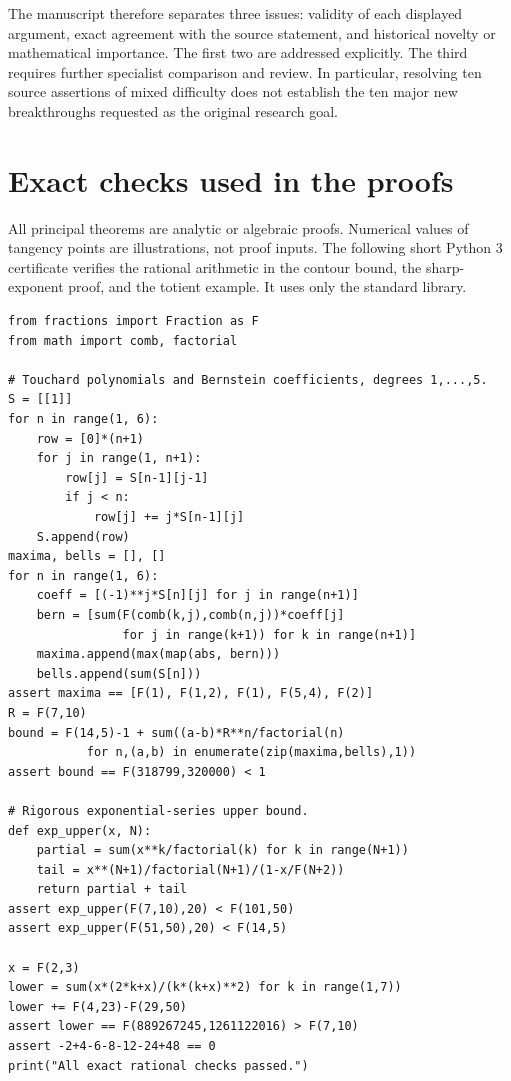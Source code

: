 \documentclass[11pt,a4paper]{article}
\theoremstyle{definition}
\theoremstyle{remark}
\numberwithin{equation}{section}
\renewcommand{\thesection}{\Roman{part}.\arabic{section}}
\renewcommand{\theHsection}{\arabic{part}.main.\arabic{section}}
\newcommand{\PartAppendix}{%
 \setcounter{section}{0}\setcounter{subsection}{0}%
 \renewcommand{\thesection}{\Roman{part}.\Alph{section}}%
 \renewcommand{\theHsection}{\arabic{part}.appendix.\arabic{section}}}
\begin{document}
The manuscript therefore separates three issues: validity of each
displayed argument, exact agreement with the source statement, and
historical novelty or mathematical importance. The first two are
addressed explicitly. The third requires further specialist comparison
and review. In particular, resolving ten source assertions of mixed
difficulty does not establish the ten major new breakthroughs requested
as the original research goal.

\PartAppendix
\section{Exact checks used in the proofs}
All principal theorems are analytic or algebraic proofs. Numerical
values of tangency points are illustrations, not proof inputs.
The following short Python 3 certificate verifies the rational
arithmetic in the contour bound, the sharp-exponent proof, and the
totient example. It uses only the standard library.
\begin{lstlisting}
from fractions import Fraction as F
from math import comb, factorial

# Touchard polynomials and Bernstein coefficients, degrees 1,...,5.
S = [[1]]
for n in range(1, 6):
    row = [0]*(n+1)
    for j in range(1, n+1):
        row[j] = S[n-1][j-1]
        if j < n:
            row[j] += j*S[n-1][j]
    S.append(row)
maxima, bells = [], []
for n in range(1, 6):
    coeff = [(-1)**j*S[n][j] for j in range(n+1)]
    bern = [sum(F(comb(k,j),comb(n,j))*coeff[j]
                for j in range(k+1)) for k in range(n+1)]
    maxima.append(max(map(abs, bern)))
    bells.append(sum(S[n]))
assert maxima == [F(1), F(1,2), F(1), F(5,4), F(2)]
R = F(7,10)
bound = F(14,5)-1 + sum((a-b)*R**n/factorial(n)
           for n,(a,b) in enumerate(zip(maxima,bells),1))
assert bound == F(318799,320000) < 1

# Rigorous exponential-series upper bound.
def exp_upper(x, N):
    partial = sum(x**k/factorial(k) for k in range(N+1))
    tail = x**(N+1)/factorial(N+1)/(1-x/F(N+2))
    return partial + tail
assert exp_upper(F(7,10),20) < F(101,50)
assert exp_upper(F(51,50),20) < F(14,5)

x = F(2,3)
lower = sum(x*(2*k+x)/(k*(k+x)**2) for k in range(1,7))
lower += F(4,23)-F(29,50)
assert lower == F(889267245,1261122016) > F(7,10)
assert -2+4-6-8-12-24+48 == 0
print("All exact rational checks passed.")
\end{lstlisting}
\end{document}
